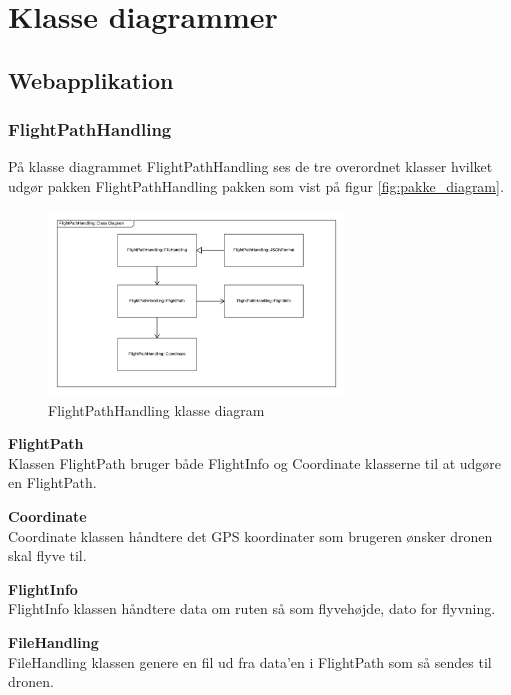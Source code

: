 \section{Klasse diagrammer}

\subsection{Webapplikation}

\subsubsection*{FlightPathHandling}
På klasse diagrammet FlightPathHandling ses de tre overordnet klasser hvilket udgør pakken FlightPathHandling pakken som vist på figur \ref{fig:pakke_diagram}.

\vspace{-5pt}
\begin{figure}[H]
	\centering
	\includegraphics[width=0.7\textwidth]{Billeder/klasse_diagrammer/FlightPathHandlingDiagram.png}
	\vspace{-5pt}
	\caption{FlightPathHandling klasse diagram}
	\label{fig:FlightPathHandling_klasse_diagram}
\end{figure}

\textbf{FlightPath}\\
Klassen FlightPath bruger både FlightInfo og Coordinate klasserne til at udgøre en FlightPath.

\textbf{Coordinate}\\
Coordinate klassen håndtere det GPS koordinater som brugeren ønsker dronen skal flyve til.

\textbf{FlightInfo}\\
FlightInfo klassen håndtere data om ruten så som flyvehøjde, dato for flyvning.

\textbf{FileHandling}\\
FileHandling klassen genere en fil ud fra data'en i FlightPath som så sendes til dronen.

